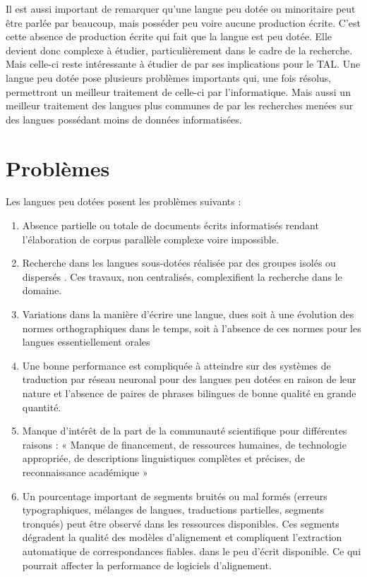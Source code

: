 Il est aussi important de remarquer qu'une langue peu dotée ou minoritaire peut être parlée par beaucoup,
mais posséder peu voire aucune production écrite. C'est cette absence de production écrite qui fait que la langue est
peu dotée. Elle devient donc complexe à étudier, particulièrement dans le cadre de la recherche. Mais celle-ci
reste intéressante à étudier de par ses implications pour le TAL. Une langue peu dotée pose plusieurs
problèmes importants qui, une fois résolus, permettront un meilleur traitement de celle-ci par l'informatique.
Mais aussi un meilleur traitement des langues plus communes de par les recherches menées sur des langues
possédant moins de données informatisées.

\section{Problèmes} \label{problemes_peudot}

Les langues peu dotées posent les problèmes suivants{ :}
\begin{enumerate}
\item Absence partielle ou totale de documents écrits informatisés rendant l'élaboration de corpus parallèle
complexe voire impossible.
\item Recherche dans les langues sous-dotées réalisée par des groupes isolés ou dispersés
\citep{bernhard_2018}. Ces travaux, non centralisés, complexifient la recherche dans le domaine.
\item Variations dans la manière d'écrire une langue, dues soit à une évolution des normes orthographiques dans le temps,
soit à l’absence de ces normes pour les langues essentiellement orales \citep{kurimo_2017} \citep{bernhard_2018}
\item Une bonne performance est compliquée à atteindre sur des systèmes de traduction par réseau
neuronal pour des langues peu dotées en raison de leur nature et l'absence de paires de phrases bilingues de
bonne qualité en grande quantité. \citep{steingrimsson_2023}
\item Manque d'intérêt de la part de la communauté scientifique pour différentes raisons{ :} {« }Manque de
financement, de ressources humaines, de technologie appropriée, de descriptions linguistiques complètes et
précises, de reconnaissance académique{ »} \citep{bernhard_2018}
\newpage
\item Un pourcentage important de segments bruités ou mal formés (erreurs typographiques, mélanges de langues,
traductions partielles, segments tronqués) peut être observé dans les ressources disponibles. Ces segments
dégradent la qualité des modèles d’alignement et compliquent l’extraction automatique de correspondances fiables.
dans le peu d'écrit disponible. Ce qui pourrait affecter la performance de logiciels d'alignement. \citep{steingrimsson_2023}
\end{enumerate}

